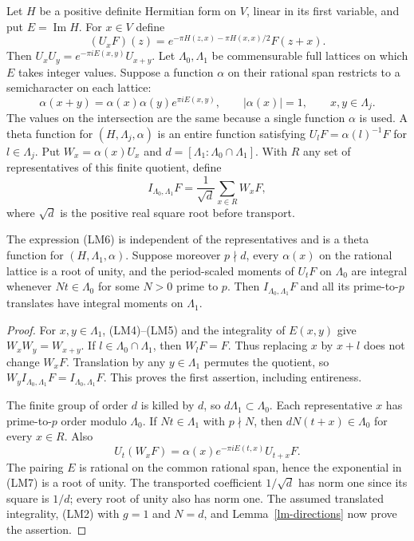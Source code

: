Let $H$ be a positive definite Hermitian form on $V$, linear in
its first variable, and put $E=\operatorname{Im}H$.  For $x\in V$
define
\[
 (U_xF)(z)=e^{-\pi H(z,x)-\pi H(x,x)/2}F(z+x).
 \tag{LM4}
\]
Then $U_xU_y=e^{-\pi iE(x,y)}U_{x+y}$.
Let $\Lambda_0,\Lambda_1$ be commensurable full lattices on which
$E$ takes integer values.  Suppose a function $\alpha$ on their
rational span restricts to a semicharacter on each lattice:
\[
 \alpha(x+y)=\alpha(x)\alpha(y)e^{\pi iE(x,y)},\qquad
 |\alpha(x)|=1,\qquad x,y\in\Lambda_j.
 \tag{LM5}
\]
The values on the intersection are the same because a single
function $\alpha$ is used.  A theta function for
$(H,\Lambda_j,\alpha)$ is an entire function satisfying
$U_lF=\alpha(l)^{-1}F$ for $l\in\Lambda_j$.
Put $W_x=\alpha(x)U_x$ and
$d=[\Lambda_1:\Lambda_0\cap\Lambda_1]$.  With $R$ any set of
representatives of this finite quotient, define
\[
 I_{\Lambda_0,\Lambda_1}F
                 =\frac1{\sqrt d}\sum_{x\in R}W_xF,
 \tag{LM6}
\]
where $\sqrt d$ is the positive real square root before transport.

\begin{proposition}\label{lm-finite-intertwiner}
The expression (LM6) is independent of the representatives and
is a theta function for $(H,\Lambda_1,\alpha)$.
Suppose moreover $p\nmid d$, every $\alpha(x)$ on the rational
lattice is a root of unity, and the period-scaled moments of
$U_tF$ on $\Lambda_0$ are integral whenever
$Nt\in\Lambda_0$ for some $N>0$ prime to $p$.
Then $I_{\Lambda_0,\Lambda_1}F$ and all its prime-to-$p$
translates have integral moments on $\Lambda_1$.
\end{proposition}
\begin{proof}
For $x,y\in\Lambda_1$, (LM4)--(LM5) and the integrality of
$E(x,y)$ give $W_xW_y=W_{x+y}$.  If
$l\in\Lambda_0\cap\Lambda_1$, then $W_lF=F$.
Thus replacing $x$ by $x+l$ does not change $W_xF$.
Translation by any $y\in\Lambda_1$ permutes the quotient, so
$W_yI_{\Lambda_0,\Lambda_1}F=I_{\Lambda_0,\Lambda_1}F$.
This proves the first assertion, including entireness.

The finite group of order $d$ is killed by $d$, so
$d\Lambda_1\subset\Lambda_0$.  Each representative $x$ has
prime-to-$p$ order modulo $\Lambda_0$.  If
$Nt\in\Lambda_1$ with $p\nmid N$, then
$dN(t+x)\in\Lambda_0$ for every $x\in R$.  Also
\[
 U_t(W_xF)=\alpha(x)e^{-\pi iE(t,x)}U_{t+x}F.
 \tag{LM7}
\]
The pairing $E$ is rational on the common rational span, hence
the exponential in (LM7) is a root of unity.
The transported coefficient $1/\sqrt d$ has norm one since its
square is $1/d$; every root of unity also has norm one.
The assumed translated integrality, (LM2) with $g=1$ and
$N=d$, and Lemma~\ref{lm-directions} now prove the assertion.
\end{proof}

